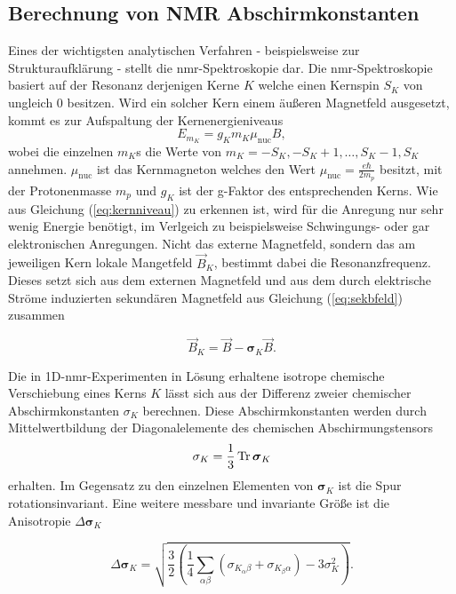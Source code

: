 	\subsection{Berechnung von NMR Abschirmkonstanten}\label{theo:nmr}
	
Eines der wichtigsten analytischen Verfahren - beispielsweise zur Strukturaufklärung - stellt die \ac{nmr}-Spektroskopie dar. Die \ac{nmr}-Spektroskopie basiert auf der Resonanz derjenigen Kerne $K$ welche einen Kernspin $S_K$ von ungleich 0 besitzen. Wird ein solcher Kern einem äußeren Magnetfeld ausgesetzt, kommt es zur Aufspaltung der Kernenergieniveaus
\begin{equation}\label{eq:kernniveau}
  E_{m_K}=g_Km_K\mu_{\textrm{nuc}}B,
\end{equation}	
wobei die einzelnen $m_K$s die Werte von $m_K=-S_K, -S_K+1, \dotsc ,S_K-1,S_K$ annehmen. $\mu_{\textrm{nuc}}$ ist das Kernmagneton welches den Wert $\mu_{\textrm{nuc}}=\frac{e\hbar}{2m_p}$ besitzt, mit der Protonenmasse $m_p$ und $g_K$ ist der g-Faktor des entsprechenden Kerns. Wie aus Gleichung (\ref{eq:kernniveau}) zu erkennen ist, wird für die Anregung nur sehr wenig Energie benötigt, im Verlgeich zu beispielsweise Schwingungs- oder gar elektronischen Anregungen. Nicht das externe Magnetfeld, sondern das am jeweiligen Kern lokale Mangetfeld $\vec{B}_K$, bestimmt dabei die Resonanzfrequenz. Dieses setzt sich aus dem externen Magnetfeld und aus dem durch elektrische Ströme induzierten sekundären Magnetfeld aus Gleichung (\ref{eq:sekbfeld}) zusammen

\begin{equation}
\vec{B}_K=\vec{B}-\boldsymbol{\sigma}_K\vec{B}.
\end{equation}


	 Die in 1D-\ac{nmr}-Experimenten in Lösung erhaltene isotrope chemische Verschiebung eines Kerns $K$ lässt sich aus der Differenz zweier chemischer Abschirmkonstanten $\sigma_K$ berechnen. Diese Abschirmkonstanten werden durch Mittelwertbildung der Diagonalelemente des chemischen Abschirmungstensors 
	\begin{equation}
	  \sigma_K=\frac{1}{3}\operatorname{Tr} \boldsymbol{\sigma}_K
	\end{equation}	 
	 erhalten. Im Gegensatz zu den einzelnen Elementen von $\boldsymbol{\sigma}_K$ ist die Spur rotationsinvariant. Eine weitere messbare und invariante Größe ist die Anisotropie $\Delta\boldsymbol{\sigma}_K$
	 
	 \begin{equation}
	 \Delta\boldsymbol{\sigma}_K=\sqrt{\frac{3}{2}\left(\frac{1}{4}\sum_{\alpha\beta}(\sigma_{K_\alpha\beta}+\sigma_{K_\beta\alpha})-3\sigma_K^2\right)}.
	 \end{equation}
	 
